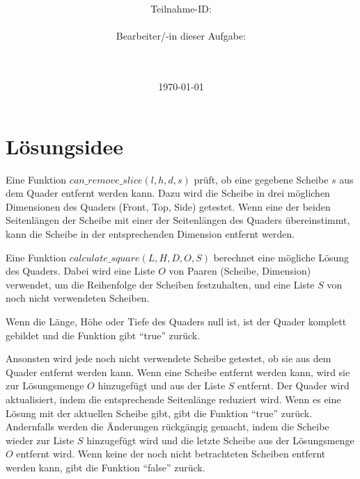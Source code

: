 \documentclass[a4paper,10pt,ngerman]{scrartcl}
\title{\textbf{\Huge\Aufgabe}}
\author{\LARGE Teilnahme-ID: \LARGE \TeilnahmeId \\\\
\LARGE Bearbeiter/-in dieser Aufgabe: \\
\LARGE \Name\\\\}
\date{\LARGE\today}
\begin{document}
    \maketitle
    \tableofcontents
    \vspace{0.5cm}

    \newpage
    \section{Lösungsidee}\label{sec:losungsidee}

    Eine Funktion $can\_remove\_slice(l, h, d, s)$ prüft, ob eine gegebene Scheibe $s$ aus dem Quader entfernt werden kann.
    Dazu wird die Scheibe in drei möglichen Dimensionen des Quaders (Front, Top, Side) getestet.
    Wenn eine der beiden Seitenlängen der Scheibe mit einer der Seitenlängen des Quaders übereinstimmt,
    kann die Scheibe in der entsprechenden Dimension entfernt werden.

    Eine Funktion $calculate\_square(L, H, D, O, S)$ berechnet eine mögliche Lösung des Quaders.
    Dabei wird eine Liste $O$ von Paaren (Scheibe, Dimension) verwendet, um die Reihenfolge der Scheiben festzuhalten,
    und eine Liste $S$ von noch nicht verwendeten Scheiben.

    Wenn die Länge, Höhe oder Tiefe des Quaders null ist, ist der Quader komplett gebildet und die Funktion gibt ``true'' zurück.

    Ansonsten wird jede noch nicht verwendete Scheibe getestet, ob sie aus dem Quader entfernt werden kann.
    Wenn eine Scheibe entfernt werden kann, wird sie zur Lösungsmenge $O$ hinzugefügt und aus der Liste $S$ entfernt.
    Der Quader wird aktualisiert, indem die entsprechende Seitenlänge reduziert wird.
    Wenn es eine Lösung mit der aktuellen Scheibe gibt, gibt die Funktion ``true'' zurück.
    Andernfalls werden die Änderungen rückgängig gemacht, indem die Scheibe wieder zur Liste $S$ hinzugefügt wird
    und die letzte Scheibe aus der Lösungsmenge $O$ entfernt wird.
    Wenn keine der noch nicht betrachteten Scheiben entfernt werden kann, gibt die Funktion ``false'' zurück.
\end{document}

